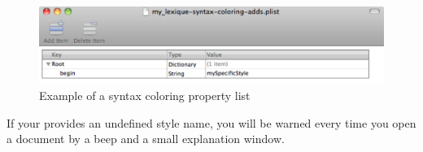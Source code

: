 \begin{figure}[ht]
  \centering
  \includegraphics[width=15cm]{chapter-project-component/custom-syntax-coloring-property-list-edition.pdf}
  \caption{Example of a syntax coloring property list}
\end{figure}

If your provides an undefined style name, you will be warned every time you open a document by a beep and a small explanation window.






 
